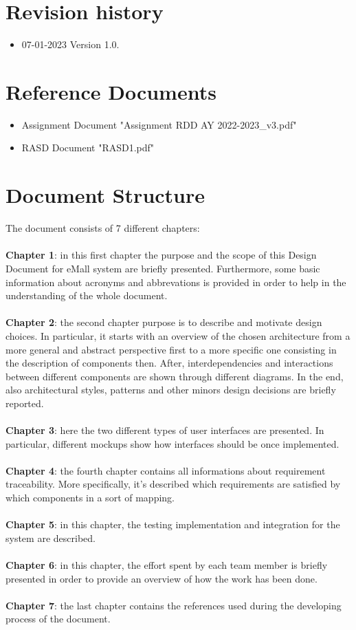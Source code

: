 \documentclass[a4paper]{report}
\begin{document}
\section{Revision history}
\begin{itemize}
\item 07-01-2023 Version 1.0.
\end{itemize}
\section{Reference Documents}
\begin{itemize}
\item Assignment Document "Assignment RDD AY 2022-2023\_v3.pdf"
\item RASD Document "RASD1.pdf"
\end{itemize}
\section{Document Structure}

The document consists of 7 different chapters:
\\
\\
\textbf{Chapter 1}: in this first chapter the purpose and the scope of this Design Document for eMall system are briefly presented. Furthermore, some basic information about acronyms and abbrevations is provided in order to help in the understanding of the whole document.\\ \\
\textbf{Chapter 2}: the second chapter purpose is to describe and motivate design choices. In particular, it starts with an overview of the chosen architecture from a more general and abstract perspective first to a more specific one consisting in the description of components then. After, interdependencies and interactions between different components are shown through different diagrams. In the end, also architectural styles, patterns and other minors design decisions are briefly reported. \\ \\
\textbf{Chapter 3}: here the two different types of user interfaces are presented. In particular, different mockups show how interfaces should be once implemented.\\ \\
\textbf{Chapter 4}: the fourth chapter contains all informations about requirement traceability. More specifically, it's described which requirements are satisfied by which components in a sort of mapping.\\ \\
\textbf{Chapter 5}: in this chapter, the testing implementation and integration for the system are described.\\ \\
\textbf{Chapter 6}: in this chapter, the effort spent by each team member is briefly presented in order to provide an overview of how the work has been done.\\ \\
\textbf{Chapter 7}: the last chapter contains the references used during the developing process of the document.
\end{document}
